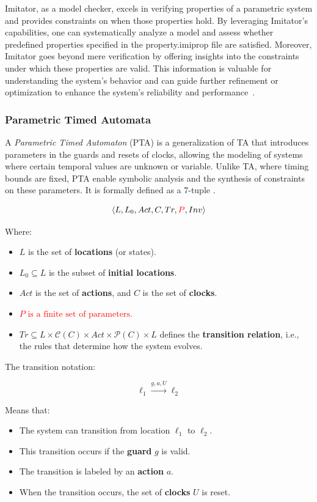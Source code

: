 Imitator, as a model checker, excels in verifying properties of a parametric system and provides constraints on when those properties hold. By leveraging Imitator's capabilities, one can systematically analyze a model and assess whether predefined properties specified in the property.imiprop file are satisfied. Moreover, Imitator goes beyond mere verification by offering insights into the constraints under which these properties are valid. This information is valuable for understanding the system's behavior and can guide further refinement or optimization to enhance the system's reliability and performance~\cite{IMITATOR}.

\subsubsection{Parametric Timed Automata}

A \textit{Parametric Timed Automaton} (PTA) is a generalization of TA that introduces parameters in the guards and resets of clocks, allowing the modeling of systems where certain temporal values are unknown or variable. Unlike TA, where timing bounds are fixed, PTA enable symbolic analysis and the synthesis of constraints on these parameters. It is formally defined as a 7-tuple \cite{andrePTA}.



\[
\langle L, L_0, Act, C, Tr, \textcolor{red}{P}, Inv\rangle
\]

Where:
\begin{itemize}
    \item \( L \) is the set of \textbf{locations} (or states).
    \item \( L_0 \subseteq L \) is the subset of \textbf{initial locations}.
    \item \( Act \) is the set of \textbf{actions}, and \( C \) is the set of \textbf{clocks}.
    \item \textcolor{red}{\( P \text{ is a finite set of parameters.} \)}
    \item \( Tr \subseteq L \times \mathcal{C}(C) \times Act \times \mathcal{P}(C) \times L \) defines the \textbf{transition relation}, i.e., the rules that determine how the system evolves.
\end{itemize}

The transition notation:

\[
\ell_1 \xrightarrow{g, a, U} \ell_2
\]

Means that:
\begin{itemize}
    \item The system can transition from location \( \ell_1 \) to \( \ell_2 \).
    \item This transition occurs if the \textbf{guard} \( g \) is valid.
    \item The transition is labeled by an \textbf{action} \( a \).
    \item When the transition occurs, the set of \textbf{clocks} \( U \) is reset.
\end{itemize}

